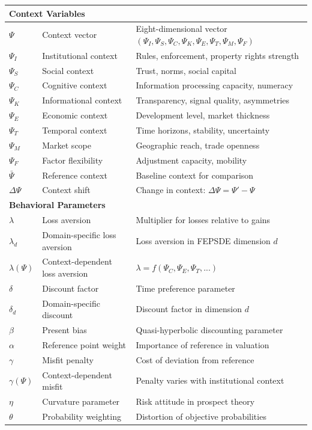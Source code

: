 \begin{center}
\begin{longtable}{lp{4cm}p{7cm}}
\multicolumn{3}{l}{\textbf{Context Variables}} \\
\hline
$\Psi$ & Context vector & Eight-dimensional vector $(\Psi_I, \Psi_S, \Psi_C, \Psi_K, \Psi_E, \Psi_T, \Psi_M, \Psi_F)$ \\
$\Psi_I$ & Institutional context & Rules, enforcement, property rights strength \\
$\Psi_S$ & Social context & Trust, norms, social capital \\
$\Psi_C$ & Cognitive context & Information processing capacity, numeracy \\
$\Psi_K$ & Informational context & Transparency, signal quality, asymmetries \\
$\Psi_E$ & Economic context & Development level, market thickness \\
$\Psi_T$ & Temporal context & Time horizons, stability, uncertainty \\
$\Psi_M$ & Market scope & Geographic reach, trade openness \\
$\Psi_F$ & Factor flexibility & Adjustment capacity, mobility \\
$\bar{\Psi}$ & Reference context & Baseline context for comparison \\
$\Delta\Psi$ & Context shift & Change in context: $\Delta\Psi = \Psi' - \Psi$ \\
\hline

\multicolumn{3}{l}{\textbf{Behavioral Parameters}} \\
\hline
$\lambda$ & Loss aversion & Multiplier for losses relative to gains \\
$\lambda_d$ & Domain-specific loss aversion & Loss aversion in FEPSDE dimension $d$ \\
$\lambda(\Psi)$ & Context-dependent loss aversion & $\lambda = f(\Psi_C, \Psi_E, \Psi_T, ...)$ \\
$\delta$ & Discount factor & Time preference parameter \\
$\delta_d$ & Domain-specific discount & Discount factor in dimension $d$ \\
$\beta$ & Present bias & Quasi-hyperbolic discounting parameter \\
$\alpha$ & Reference point weight & Importance of reference in valuation \\
$\gamma$ & Misfit penalty & Cost of deviation from reference \\
$\gamma(\Psi)$ & Context-dependent misfit & Penalty varies with institutional context \\
$\eta$ & Curvature parameter & Risk attitude in prospect theory \\
$\theta$ & Probability weighting & Distortion of objective probabilities \\
\hline


\end{longtable}
\end{center}
